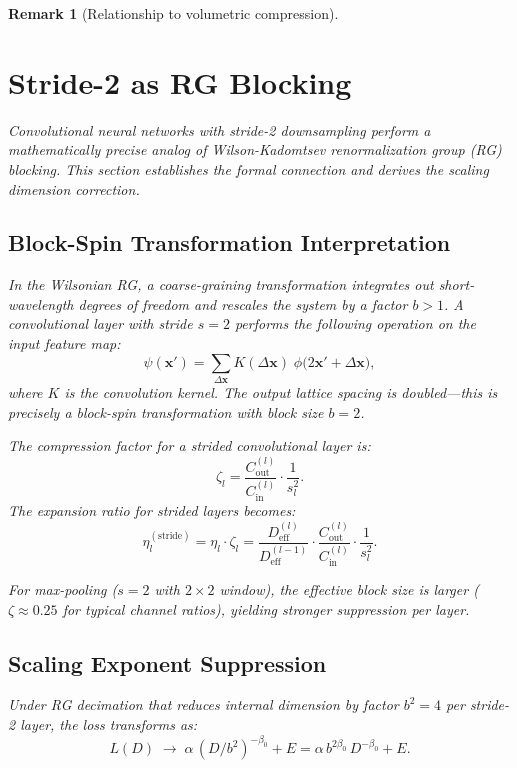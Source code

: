 \documentclass[11pt, a4paper]{article}
\theoremstyle{plain}
\newtheorem*{remark}{Remark}
\begin{document}
\begin{remark}[Relationship to volumetric compression]
\section{Stride-2 as RG Blocking}
\label{sec:stride_rg_blocking}

Convolutional neural networks with stride-2 downsampling perform a mathematically precise analog of Wilson-Kadomtsev renormalization group (RG) blocking. This section establishes the formal connection and derives the scaling dimension correction.

\subsection{Block-Spin Transformation Interpretation}

In the Wilsonian RG, a coarse-graining transformation integrates out short-wavelength degrees of freedom and rescales the system by a factor $b > 1$. A convolutional layer with stride $s=2$ performs the following operation on the input feature map:
\begin{equation}
\psi(\mathbf{x}') = \sum_{\Delta\mathbf{x}} K(\Delta\mathbf{x})\;\phi\bigl(2\mathbf{x}' + \Delta\mathbf{x}\bigr),
\end{equation}
where $K$ is the convolution kernel. The output lattice spacing is doubled---this is precisely a block-spin transformation with block size $b = 2$.

The compression factor for a strided convolutional layer is:
\begin{equation}
\zeta_l = \frac{C_{\mathrm{out}}^{(l)}}{C_{\mathrm{in}}^{(l)}} \cdot \frac{1}{s_l^2}.
\end{equation}
The expansion ratio for strided layers becomes:
\begin{equation}
\eta_l^{(\mathrm{stride})} = \eta_l \cdot \zeta_l = \frac{D_{\mathrm{eff}}^{(l)}}{D_{\mathrm{eff}}^{(l-1)}} \cdot \frac{C_{\mathrm{out}}^{(l)}}{C_{\mathrm{in}}^{(l)}} \cdot \frac{1}{s_l^2}.
\end{equation}

For max-pooling ($s=2$ with $2\times 2$ window), the effective block size is larger ($\zeta \approx 0.25$ for typical channel ratios), yielding stronger suppression per layer.

\subsection{Scaling Exponent Suppression}

Under RG decimation that reduces internal dimension by factor $b^2 = 4$ per stride-2 layer, the loss transforms as:
\begin{equation}
L(D) \;\longrightarrow\; \alpha\,(D/b^2)^{-\beta_0} + E = \alpha\,b^{2\beta_0}\,D^{-\beta_0} + E.
\end{equation}


\end{remark}
\end{document}

